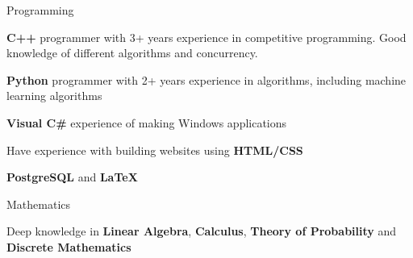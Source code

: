 \begin{cventries}
  \cventry
    {}
    {Programming}
    {}
    {}
    {
      \begin{cvitems}
        \item {\textbf{C++} programmer with 3+ years experience in competitive programming. Good knowledge of different algorithms and concurrency.}
        \item {\textbf{Python} programmer with 2+ years experience in algorithms, including machine learning algorithms}
        \item {\textbf{Visual C\#} experience of making Windows applications}
        \item {Have experience with building websites using \textbf{HTML/CSS} }
        \item {\textbf{PostgreSQL} and \textbf{\LaTeX}}
      \end{cvitems}
    }
  \cventry
    {}
    {Mathematics}
    {}
    {}
    {
      \begin{cvitems}
        \item {Deep knowledge in \textbf{Linear Algebra}, \textbf{Calculus}, \textbf{Theory of Probability} and \textbf{Discrete Mathematics}}
      \end{cvitems}
    }

\end{cventries}

